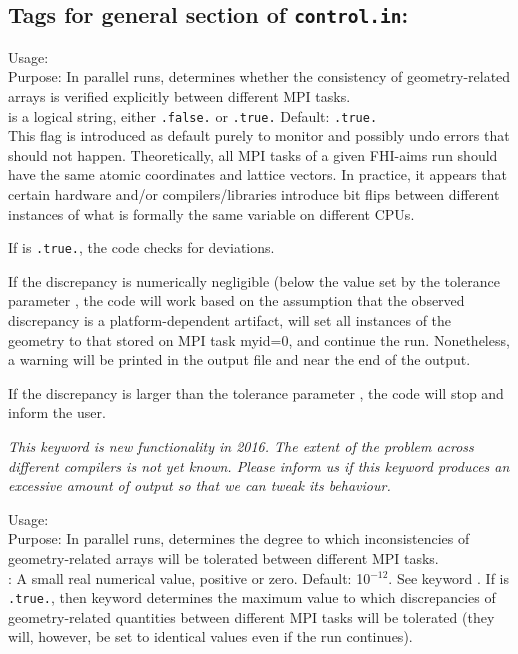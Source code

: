 \newpage

\subsection*{Tags for general section of \texttt{control.in}:}

{
  \noindent
  Usage:   \\[1.0ex]
  Purpose: In parallel runs, determines whether the consistency of geometry-related
           arrays is verified explicitly between different MPI tasks. \\[1.0ex]
   is a logical string, either \texttt{.false.} or
    \texttt{.true.} Default: \texttt{.true.} \\
}
%
This flag is introduced as default purely to monitor and possibly undo errors
that should not happen. Theoretically, all MPI tasks of a given FHI-aims run
should have the same atomic coordinates and lattice vectors. In practice, it 
appears that certain hardware and/or compilers/libraries introduce bit flips
between different instances of what is formally the same variable on different
CPUs. 

If  is \texttt{.true.}, the code checks
for deviations. 

If the discrepancy is numerically negligible (below the
value set by the tolerance parameter , 
the code will work based on the assumption that the observed discrepancy is
a platform-dependent artifact, will set all instances of the geometry to
that stored on MPI task myid=0, and continue the run. Nonetheless, a warning
will be printed in the output file and near the end of the output.

If the discrepancy is larger than the tolerance parameter
, the code will stop and inform
the user.

\emph{
This keyword is new functionality in 2016. The extent of the problem
across different compilers is not yet known. Please inform us if this
keyword produces an excessive amount of output so that we can tweak
its behaviour.}

{
  \noindent
  Usage:   \\[1.0ex]
  Purpose: In parallel runs, determines the degree to which
    inconsistencies of geometry-related arrays will be tolerated
    between different MPI tasks. \\[1.0ex] 
   : A small real numerical value, positive or zero. Default:
    10$^{-12}$. 
}
%
See keyword . If
 is \texttt{.true.}, then keyword
 determines the maximum value
to which discrepancies of geometry-related quantities between
different MPI tasks will be tolerated (they will, however, be
set to identical values even if the run continues).

